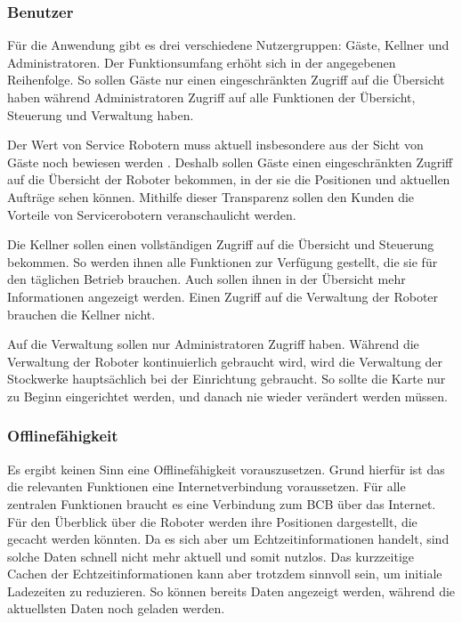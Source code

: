 \subsubsection{Benutzer}

Für die Anwendung gibt es drei verschiedene Nutzergruppen: Gäste, Kellner und Administratoren. Der Funktionsumfang erhöht sich in der angegebenen Reihenfolge. So sollen Gäste nur einen eingeschränkten Zugriff auf die Übersicht haben während Administratoren Zugriff auf alle Funktionen der Übersicht, Steuerung und Verwaltung haben.

Der Wert von Service Robotern muss aktuell insbesondere aus der Sicht von Gäste noch bewiesen werden \cite[S.~429]{Paluch2020}. Deshalb sollen Gäste einen eingeschränkten Zugriff auf die Übersicht der Roboter bekommen, in der sie die Positionen und aktuellen Aufträge sehen können. Mithilfe dieser Transparenz sollen den Kunden die Vorteile von Servicerobotern veranschaulicht werden.

Die Kellner sollen einen vollständigen Zugriff auf die Übersicht und Steuerung bekommen. So werden ihnen alle Funktionen zur Verfügung gestellt, die sie für den täglichen Betrieb brauchen. Auch sollen ihnen in der Übersicht mehr Informationen angezeigt werden. Einen Zugriff auf die Verwaltung der Roboter brauchen die Kellner nicht.

Auf die Verwaltung sollen nur Administratoren Zugriff haben. Während die Verwaltung der Roboter kontinuierlich gebraucht wird, wird die Verwaltung der Stockwerke hauptsächlich bei der Einrichtung gebraucht. So sollte die Karte nur zu Beginn eingerichtet werden, und danach nie wieder verändert werden müssen.

\subsubsection{Offlinefähigkeit}

Es ergibt keinen Sinn eine Offlinefähigkeit vorauszusetzen. Grund hierfür ist das die relevanten Funktionen eine Internetverbindung voraussetzen. Für alle zentralen Funktionen braucht es eine Verbindung zum \ac{BCB} über das Internet. Für den Überblick über die Roboter werden ihre Positionen dargestellt, die gecacht werden könnten. Da es sich aber um Echtzeitinformationen handelt, sind solche Daten schnell nicht mehr aktuell und somit nutzlos. Das kurzzeitige Cachen der Echtzeitinformationen kann aber trotzdem sinnvoll sein, um initiale Ladezeiten zu reduzieren. So können bereits Daten angezeigt werden, während die aktuellsten Daten noch geladen werden.

